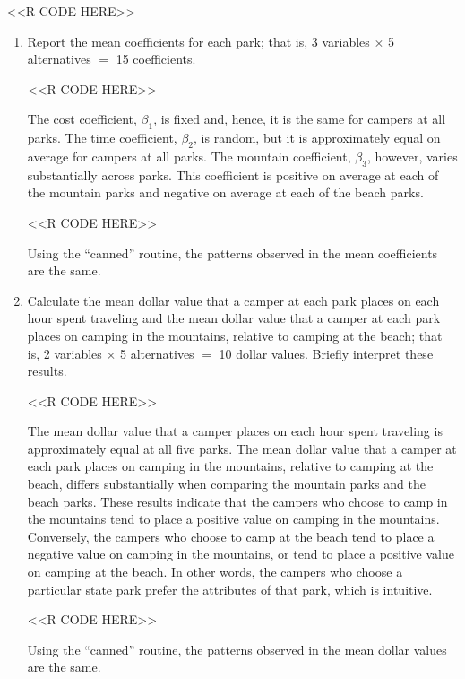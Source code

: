 \documentclass[11pt,letterpaper]{article}
\begin{document}
\begin{enumerate}[label=\alph*., leftmargin=*]
	<<R CODE HERE>>

	\begin{enumerate}[label=\roman*.]
		\item Report the mean coefficients for each park; that is, 3 variables $\times$ 5 alternatives $=$ 15 coefficients.

		<<R CODE HERE>>

		The cost coefficient, $\beta_1$, is fixed and, hence, it is the same for campers at all parks. The time coefficient, $\beta_2$, is random, but it is approximately equal on average for campers at all parks. The mountain coefficient, $\beta_3$, however, varies substantially across parks. This coefficient is positive on average at each of the mountain parks and negative on average at each of the beach parks.

		<<R CODE HERE>>

		Using the ``canned'' routine, the patterns observed in the mean coefficients are the same.

		\item Calculate the mean dollar value that a camper at each park places on each hour spent traveling and the mean dollar value that a camper at each park places on camping in the mountains, relative to camping at the beach; that is, 2 variables $\times$ 5 alternatives $=$ 10 dollar values. Briefly interpret these results.

		<<R CODE HERE>>

		The mean dollar value that a camper places on each hour spent traveling is approximately equal at all five parks. The mean dollar value that a camper at each park places on camping in the mountains, relative to camping at the beach, differs substantially when comparing the mountain parks and the beach parks. These results indicate that the campers who choose to camp in the mountains tend to place a positive value on camping in the mountains. Conversely, the campers who choose to camp at the beach tend to place a negative value on camping in the mountains, or tend to place a positive value on camping at the beach. In other words, the campers who choose a particular state park prefer the attributes of that park, which is intuitive.

		<<R CODE HERE>>

		Using the ``canned'' routine, the patterns observed in the mean dollar values are the same.
	\end{enumerate}
\end{enumerate}
\end{document}
